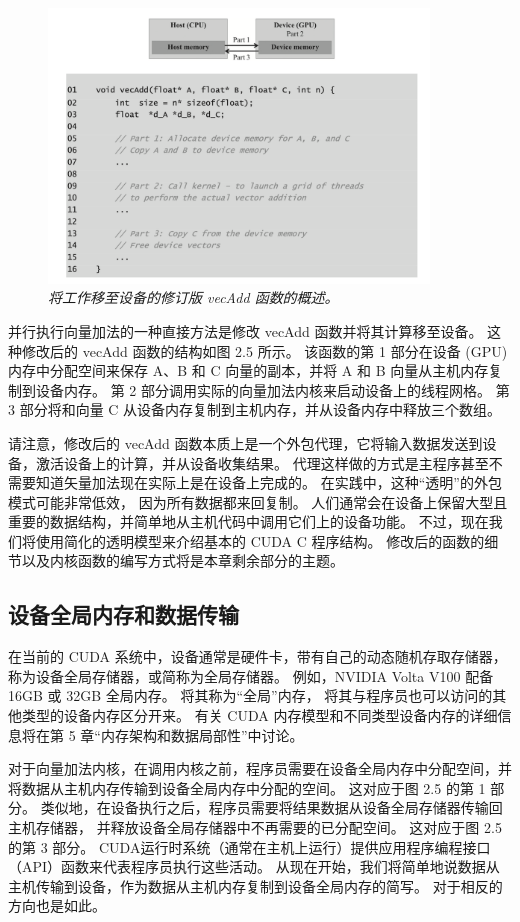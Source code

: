 \begin{figure}[H]
	\centering
	\includegraphics[width=0.9\textwidth]{figs/F2.5.png}
	\caption{\textit{将工作移至设备的修订版 vecAdd 函数的概述。}}
\end{figure}

并行执行向量加法的一种直接方法是修改 vecAdd 函数并将其计算移至设备。 这种修改后的 vecAdd 函数的结构如图 2.5 所示。 
该函数的第 1 部分在设备 (GPU) 内存中分配空间来保存 A、B 和 C 向量的副本，并将 A 和 B 向量从主机内存复制到设备内存。 
第 2 部分调用实际的向量加法内核来启动设备上的线程网格。 
第 3 部分将和向量 C 从设备内存复制到主机内存，并从设备内存中释放三个数组。

请注意，修改后的 vecAdd 函数本质上是一个外包代理，它将输入数据发送到设备，激活设备上的计算，并从设备收集结果。 
代理这样做的方式是主程序甚至不需要知道矢量加法现在实际上是在设备上完成的。 在实践中，这种“透明”的外包模式可能非常低效，
因为所有数据都来回复制。 人们通常会在设备上保留大型且重要的数据结构，并简单地从主机代码中调用它们上的设备功能。 
不过，现在我们将使用简化的透明模型来介绍基本的 CUDA C 程序结构。 
修改后的函数的细节以及内核函数的编写方式将是本章剩余部分的主题。

\subsection{设备全局内存和数据传输}
在当前的 CUDA 系统中，设备通常是硬件卡，带有自己的动态随机存取存储器，称为设备全局存储器，或简称为全局存储器。 
例如，NVIDIA Volta V100 配备 16GB 或 32GB 全局内存。 将其称为“全局”内存，
将其与程序员也可以访问的其他类型的设备内存区分开来。 
有关 CUDA 内存模型和不同类型设备内存的详细信息将在第 5 章“内存架构和数据局部性”中讨论。

对于向量加法内核，在调用内核之前，程序员需要在设备全局内存中分配空间，并将数据从主机内存传输到设备全局内存中分配的空间。 
这对应于图 2.5 的第 1 部分。 类似地，在设备执行之后，程序员需要将结果数据从设备全局存储器传输回主机存储器，
并释放设备全局存储器中不再需要的已分配空间。 这对应于图 2.5 的第 3 部分。 
CUDA运行时系统（通常在主机上运行）提供应用程序编程接口（API）函数来代表程序员执行这些活动。 
从现在开始，我们将简单地说数据从主机传输到设备，作为数据从主机内存复制到设备全局内存的简写。 对于相反的方向也是如此。

